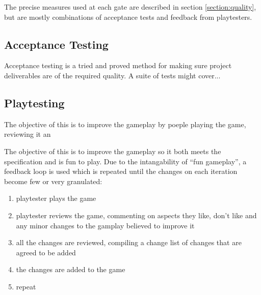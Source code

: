 The precise measures used at each gate are described in section \ref{section:quality}, but are mostly combinations of acceptance tests and feedback from playtesters.

\subsection{Acceptance Testing}

Acceptance testing is a tried and proved method for making sure project deliverables are of the required quality. A suite of tests might cover...

\subsection{Playtesting}


The objective of this is to improve the gameplay by poeple playing the game, reviewing it an

The objective of this is to improve the gameplay so it both meets the specification and is fun to play.
Due to the intangability of ``fun gameplay'', a feedback loop is used which is repeated until the changes on each iteration become few or very granulated:
\begin{enumerate}
\item playtester plays the game
\item playtester reviews the game, commenting on aspects they like, don't like and any minor changes to the gamplay believed to improve it
\item all the changes are reviewed, compiling a change list of changes that are agreed to be added
\item the changes are added to the game
\item repeat
\end{enumerate}

